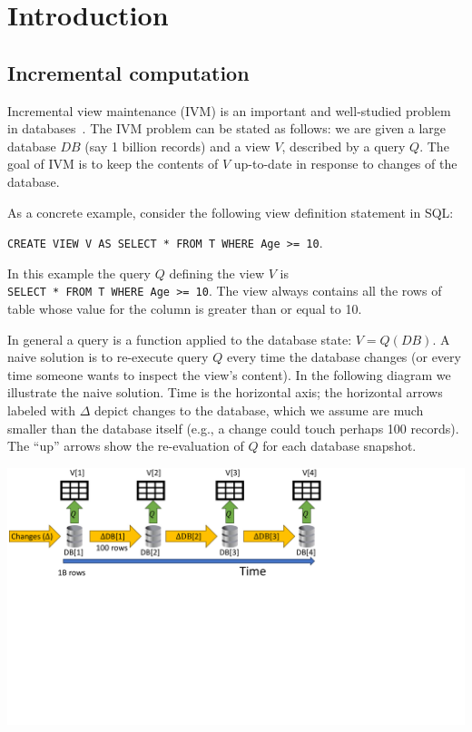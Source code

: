 \section{Introduction}\label{sec:introduction}

\subsection{Incremental computation}\label{sec:intro-incremental}

Incremental view maintenance (IVM) is an important and well-studied
problem in databases~\cite{gupta-idb95}.  The IVM problem can be
stated as follows: we are given a large database $DB$ (say 1 billion
records) and a view $V$, described by a query $Q$.  The goal of IVM is
to keep the contents of $V$ up-to-date in response to changes of the
database.

As a concrete example, consider the following view definition
statement in SQL:

\texttt{CREATE VIEW V AS SELECT * FROM T WHERE Age >= 10}.

In this example the query $Q$ defining the view $V$ is
\\ \texttt{SELECT * FROM T WHERE Age >= 10}.  The view  always
contains all the rows of table  whose value for the column
 is greater than or equal to 10.

In general a query is a function applied to the database state: $V =
Q(DB)$.  A naive solution is to re-execute query $Q$ every time the
database changes (or every time someone wants to inspect the view's
content).  In the following diagram we illustrate the naive solution.
Time is the horizontal axis; the horizontal arrows labeled with
$\Delta$ depict changes to the database, which we assume are much
smaller than the database itself (e.g., a change could touch perhaps
100 records).  The ``up'' arrows show the re-evaluation of $Q$ for
each database snapshot.

\includegraphics[trim={0 3.9in 4.1in 0},clip,scale=.30]{view.pdf}

